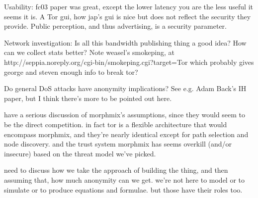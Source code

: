 Usability: fc03 paper was great, except the lower latency you are the
less useful it seems it is.
A Tor gui, how jap's gui is nice but does not reflect the security
they provide.
Public perception, and thus advertising, is a security parameter.

Network investigation: Is all this bandwidth publishing thing a good idea?
How can we collect stats better? Note weasel's smokeping, at
http://seppia.noreply.org/cgi-bin/smokeping.cgi?target=Tor
which probably gives george and steven enough info to break tor?

Do general DoS attacks have anonymity implications? See e.g. Adam
Back's IH paper, but I think there's more to be pointed out here.


have a serious discussion of morphmix's assumptions, since they would
seem to be the direct competition. in fact tor is a flexible architecture
that would encompass morphmix, and they're nearly identical except for
path selection and node discovery. and the trust system morphmix has
seems overkill (and/or insecure) based on the threat model we've picked.

need to discuss how we take the approach of building the thing, and then
assuming that, how much anonymity can we get. we're not here to model or
to simulate or to produce equations and formulae. but those have their
roles too.

